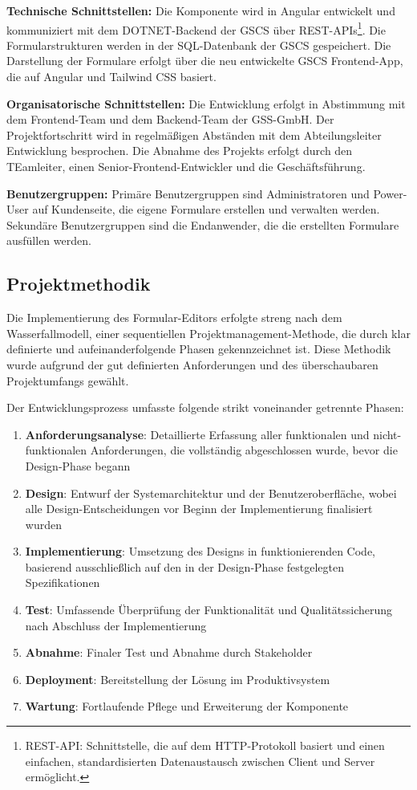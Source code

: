 \documentclass[a4paper,11pt]{article}
\begin{document}
\noindent \textbf{Technische Schnittstellen:} Die Komponente wird in Angular entwickelt und kommuniziert mit dem DOTNET-Backend der GSCS über REST-APIs\footnote{REST-API: Schnittstelle, die auf dem HTTP-Protokoll basiert und einen einfachen, standardisierten Datenaustausch zwischen Client und Server ermöglicht.}. Die Formularstrukturen werden in der SQL-Datenbank der GSCS gespeichert. Die Darstellung der Formulare erfolgt über die neu entwickelte GSCS Frontend-App, die auf Angular und Tailwind CSS basiert.


\noindent \textbf{Organisatorische Schnittstellen:} Die Entwicklung erfolgt in Abstimmung mit dem Frontend-Team und dem Backend-Team der GSS-GmbH. Der Projektfortschritt wird in regelmäßigen Abständen mit dem Abteilungsleiter Entwicklung besprochen. Die Abnahme des Projekts erfolgt durch den TEamleiter, einen Senior-Frontend-Entwickler und die Geschäftsführung.

\noindent \textbf{Benutzergruppen:} Primäre Benutzergruppen sind Administratoren und Power-User auf Kundenseite, die eigene Formulare erstellen und verwalten werden. Sekundäre Benutzergruppen sind die Endanwender, die die erstellten Formulare ausfüllen werden.

\subsection{Projektmethodik}
Die Implementierung des Formular-Editors erfolgte streng nach dem Wasserfallmodell, einer sequentiellen Projektmanagement-Methode, die durch klar definierte und aufeinanderfolgende Phasen gekennzeichnet ist. Diese Methodik wurde aufgrund der gut definierten Anforderungen und des überschaubaren Projektumfangs gewählt.

Der Entwicklungsprozess umfasste folgende strikt voneinander getrennte Phasen:
\begin{enumerate}
  \item \textbf{Anforderungsanalyse}: Detaillierte Erfassung aller funktionalen und nicht-funktionalen Anforderungen, die vollständig abgeschlossen wurde, bevor die Design-Phase begann
  \item \textbf{Design}: Entwurf der Systemarchitektur und der Benutzeroberfläche, wobei alle Design-Entscheidungen vor Beginn der Implementierung finalisiert wurden
  \item \textbf{Implementierung}: Umsetzung des Designs in funktionierenden Code, basierend ausschließlich auf den in der Design-Phase festgelegten Spezifikationen
  \item \textbf{Test}: Umfassende Überprüfung der Funktionalität und Qualitätssicherung nach Abschluss der Implementierung
  \item \textbf{Abnahme}: Finaler Test und Abnahme durch Stakeholder
  \item \textbf{Deployment}: Bereitstellung der Lösung im Produktivsystem
  \item \textbf{Wartung}: Fortlaufende Pflege und Erweiterung der Komponente
\end{enumerate}
\end{document}
